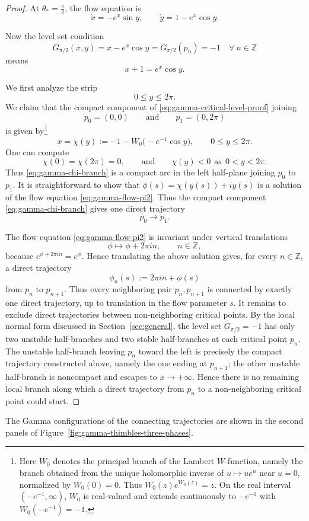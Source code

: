 \documentclass[11pt]{amsart}
\theoremstyle{plain}
\newcommand{\Z}{\mathbb Z}
\begin{document}
\begin{proof}
At \(\theta_*=\frac{\pi}{2}\), the flow equation is
\begin{equation}\label{eq:gamma-flow-pi2}
    \dot x=-e^x\sin y,
\qquad
\dot y=1-e^x\cos y.
\end{equation}

Now the level set condition
\[
G_{\pi/2}(x,y)=x-e^x\cos y=G_{\pi/2}(p_n)=-1\quad \forall~n\in\Z
\]
means
\begin{equation}\label{eq:gamma-critical-level-proof}
x+1=e^x\cos y.
\end{equation}

We first analyze the strip
\[
0\le y\le 2\pi.
\]
We claim that the compact component of \eqref{eq:gamma-critical-level-proof} joining
\[
p_0=(0,0)
\qquad\text{and}\qquad
p_1=(0,2\pi)
\]
is given by\footnote{Here \(W_0\) denotes the principal branch of the Lambert \(W\)-function, namely the branch obtained from the unique holomorphic inverse of \(u\mapsto ue^u\) near \(u=0\), normalized by \(W_0(0)=0\). Thus \(W_0(z)e^{W_0(z)}=z\). On the real interval \((-e^{-1},\infty)\), \(W_0\) is real-valued and extends continuously to \(-e^{-1}\) with \(W_0(-e^{-1})=-1\).}
\begin{equation}\label{eq:gamma-chi-branch}
x=\chi(y):=-1-W_0\bigl(-e^{-1}\cos y\bigr),
\qquad 0\le y\le 2\pi.
\end{equation}
One can compute
\[
\chi(0)=\chi(2\pi)=0, \qquad \text{and} \qquad 
\chi(y)<0 \ \ \text{as} \ \ 0<y<2\pi.
\]
Thus \eqref{eq:gamma-chi-branch} is a compact arc in the left half-plane joining \(p_0\) to \(p_1\). It is straightforward to show that \(\phi(s)=\chi(y(s))+iy(s)\) is a solution of the flow equation \eqref{eq:gamma-flow-pi2}. Thus the compact component \eqref{eq:gamma-chi-branch} gives one direct trajectory
\[
p_0\longrightarrow p_1.
\]

The flow equation \eqref{eq:gamma-flow-pi2} is invariant under vertical translations
\[
\phi\longmapsto \phi+2\pi i n,
\qquad n\in\Z,
\]
because \(e^{\phi+2\pi i n}=e^\phi\). Hence translating the above solution gives, for every \(n\in\Z\), a direct trajectory
\[
\phi_n(s):=2\pi i n+\phi(s)
\]
from $p_n$ to $p_{n+1}$. Thus every neighboring pair \(p_n,p_{n+1}\) is connected by exactly one direct trajectory, up to translation in the flow parameter \(s\).
It remains to exclude direct trajectories between non-neighboring critical points.  By the local normal form discussed in Section~\ref{sec:general}, the level set \(G_{\pi/2}=-1\) has only two unstable half-branches and two stable half-branches at each critical point \(p_n\).  The unstable half-branch leaving \(p_n\) toward the left is precisely the compact trajectory constructed above, namely the one ending at \(p_{n+1}\); the other unstable half-branch is noncompact and escapes to \(x\to+\infty\).  Hence there is no remaining local branch along which a direct trajectory from \(p_n\) to a non-neighboring critical point could start.
\end{proof}
The Gamma configurations of the connecting trajectories are shown in the second panels of Figure~\ref{fig:gamma-thimbles-three-phases}.
\end{document}

